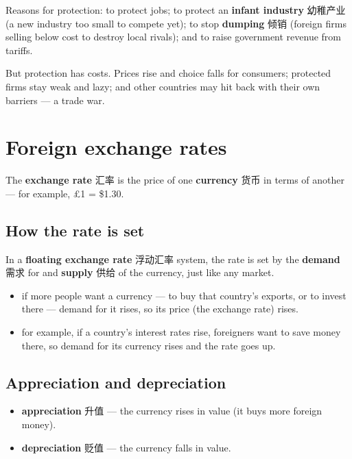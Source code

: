 \documentclass[11pt]{article}
\begin{document}
Reasons for protection: to protect jobs; to protect an \textbf{infant industry} 幼稚产业 (a new industry too small to compete yet); to stop \textbf{dumping} 倾销 (foreign firms selling below cost to destroy local rivals); and to raise government revenue from tariffs.

But protection has costs. Prices rise and choice falls for consumers; protected firms stay weak and lazy; and other countries may hit back with their own barriers — a trade war.

\section*{Foreign exchange rates}

The \textbf{exchange rate} 汇率 is the price of one \textbf{currency} 货币 in terms of another — for example, £1 = \$1.30.

\subsection*{How the rate is set}

In a \textbf{floating exchange rate} 浮动汇率 system, the rate is set by the \textbf{demand} 需求 for and \textbf{supply} 供给 of the currency, just like any market.

\begin{itemize}
\item if more people want a currency — to buy that country's exports, or to invest there — demand for it rises, so its price (the exchange rate) rises.

\item for example, if a country's interest rates rise, foreigners want to save money there, so demand for its currency rises and the rate goes up.

\end{itemize}

\subsection*{Appreciation and depreciation}

\begin{itemize}
\item \textbf{appreciation} 升值 — the currency rises in value (it buys more foreign money).

\item \textbf{depreciation} 贬值 — the currency falls in value.

\end{itemize}
\end{document}
